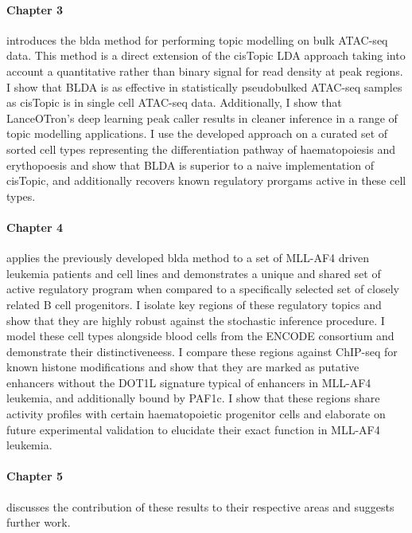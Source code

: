 \paragraph{Chapter 3} introduces the \gls{blda} method for performing topic modelling on bulk ATAC-seq data. This method is a direct extension of the cisTopic LDA approach taking into account a quantitative rather than binary signal for read density at peak regions. I show that BLDA is as effective in statistically pseudobulked ATAC-seq samples as cisTopic is in single cell ATAC-seq data. Additionally, I show that LanceOTron's deep learning peak caller results in cleaner inference in a range of topic modelling applications. I use the developed approach on a curated set of sorted cell types representing the differentiation pathway of haematopoiesis and erythopoesis and show that BLDA is superior to a naive implementation of cisTopic, and additionally recovers known regulatory prorgams active in these cell types.

\paragraph{Chapter 4} applies the previously developed \gls{blda} method to a set of MLL-AF4 driven leukemia patients and cell lines and demonstrates a unique and shared set of active regulatory program when compared to a specifically selected set of closely related B cell progenitors. I isolate key regions of these regulatory topics and show that they are highly robust against the stochastic inference procedure. I model these cell types alongside blood cells from the ENCODE consortium and demonstrate their distinctiveneess. I compare these regions against ChIP-seq for known histone modifications and show that they are marked as putative enhancers without the DOT1L signature typical of enhancers in MLL-AF4 leukemia, and additionally bound by PAF1c. I show that these regions share activity profiles with certain haematopoietic progenitor cells and elaborate on future experimental validation to elucidate their exact function in MLL-AF4 leukemia.  

\paragraph{Chapter 5} discusses the contribution of these results to their respective areas and suggests further work.




